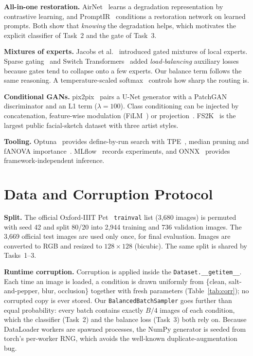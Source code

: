 ﻿\documentclass[conference]{IEEEtran}
\begin{document}
\textbf{All-in-one restoration.} AirNet~\cite{li2022airnet} learns a degradation representation by
contrastive learning, and PromptIR~\cite{potlapalli2023promptir} conditions a restoration network on
learned prompts. Both show that \emph{knowing} the degradation helps, which motivates the explicit
classifier of Task~2 and the gate of Task~3.

\textbf{Mixtures of experts.} Jacobs et al.~\cite{jacobs1991moe} introduced gated mixtures of local
experts. Sparse gating~\cite{shazeer2017moe} and Switch Transformers~\cite{fedus2022switch} added
\emph{load-balancing} auxiliary losses because gates tend to collapse onto a few experts. Our balance
term follows the same reasoning. A temperature-scaled softmax~\cite{hinton2015distill} controls how
sharp the routing is.

\textbf{Conditional GANs.} pix2pix~\cite{isola2017pix2pix} pairs a U-Net generator with a PatchGAN
discriminator and an L1 term ($\lambda=100$). Class conditioning can be injected by concatenation,
feature-wise modulation (FiLM~\cite{perez2018film}) or projection~\cite{miyato2018cgans}. FS2K~\cite{fan2022fs2k}
is the largest public facial-sketch dataset with three artist styles.

\textbf{Tooling.} Optuna~\cite{akiba2019optuna} provides define-by-run search with TPE~\cite{bergstra2011tpe},
median pruning and fANOVA importance~\cite{hutter2014fanova}. MLflow~\cite{mlflow} records experiments,
and ONNX~\cite{onnx} provides framework-independent inference.

\section{Data and Corruption Protocol}\label{sec:data}
\textbf{Split.} The official Oxford-IIIT Pet~\cite{parkhi2012pets} \texttt{trainval} list (3,680
images) is permuted with seed 42 and split 80/20 into 2,944 training and 736 validation images. The
3,669 official test images are used only once, for final evaluation. Images are converted to RGB and
resized to $128\times128$ (bicubic). The same split is shared by Tasks~1--3.

\textbf{Runtime corruption.} Corruption is applied inside the \texttt{Dataset.\_\_getitem\_\_}. Each
time an image is loaded, a condition is drawn uniformly from \{clean, salt-and-pepper, blur, occlusion\}
together with fresh parameters (Table~\ref{tab:corr}); no corrupted copy is ever stored. Our
\texttt{BalancedBatchSampler} goes further than equal probability: every batch contains exactly $B/4$
images of each condition, which the classifier (Task~2) and the balance loss (Task~3) both rely on.
Because DataLoader workers are spawned processes, the NumPy generator is seeded from torch's per-worker
RNG, which avoids the well-known duplicate-augmentation bug.
\end{document}
